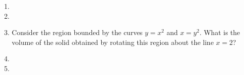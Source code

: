 \begin{enumerate}[ref={\fcProblemRef}]
\item 
 
\item  
\item Consider the region bounded by the curves $y = x^2$ and $x = y^2$. What is the volume of the solid obtained by
rotating this region about the line $x = 2$?

\item 
\item 


\end{enumerate}
